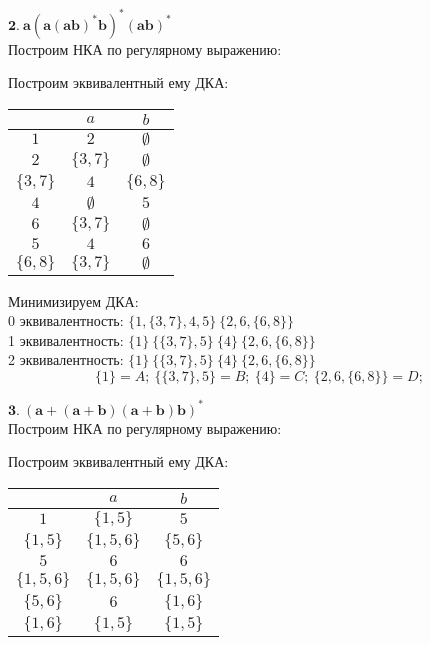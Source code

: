 \documentclass[12pt]{article}
\begin{document}
	$\boldsymbol{2.\ a(a(ab)^*b)^*(ab)^*}$ \\
	Построим НКА по регулярному выражению: 
	\begin{center}
	\end{center}
	Построим эквивалентный ему ДКА:
	\begin{center}
		\begin{tabular}{|c|c|c|}
		\hline
		$\ $ & $a$ & $b$ \\
		\hline
		$1$ & $2$ & $\emptyset$ \\
		\hline
		$2$ & $\{3,7\}$ & $\emptyset$ \\
		\hline
		$\{3,7\}$ & $4$ & $\{6,8\}$ \\
		\hline
		$4$ & $\emptyset$ & $5$ \\
		\hline
		$6$ & $\{3,7\}$ & $\emptyset$ \\
		\hline
		$5$ & $4$ & $6$ \\
		\hline
		$\{6,8\}$ & $\{3,7\}$ & $\emptyset$ \\
		\hline
		\end{tabular}
		
	\end{center}
	Минимизируем ДКА: \\
	0 эквивалентность: $\{1,\{3,7\},4,5\}\ \{2,6,\{6,8\}\}$ \\
	1 эквивалентность: $\{1\}\ \{\{3,7\},5\}\ \{4\}\ \{2,6,\{6,8\}\}$ \\
	2 эквивалентность: $\{1\}\ \{\{3,7\},5\}\ \{4\}\ \{2,6,\{6,8\}\}$ \\
	$$\{1\}=A;\ \{\{3,7\},5\}=B;\ \{4\}=C;\ \{2,6,\{6,8\}\}=D;$$
	\begin{center}
	\end{center}
	$\boldsymbol{3.\ (a+(a+b)(a+b)b)^*}$ \\
	Построим НКА по регулярному выражению:
	\begin{center}
	\end{center}
	Построим эквивалентный ему ДКА:
		\begin{center}
		\begin{tabular}{|c|c|c|}
		\hline
		$\ $ & $a$ & $b$ \\
		\hline
		$1$ & $\{1,5\}$ & $5$ \\
		\hline
		$\{1,5\}$ & $\{1,5,6\}$ & $\{5,6\}$ \\	
		\hline
		$5$ & $6$ & $6$ \\	
		\hline
		$\{1,5,6\}$ & $\{1,5,6\}$ & $\{1,5,6\}$ \\	
		\hline
		$\{5,6\}$ & $6$ & $\{1,6\}$ \\
		\hline
		$\{1,6\}$ & $\{1,5\}$ & $\{1,5\}$ \\	
		\hline	
		\end{tabular}
		
	\end{center}
\end{document}
